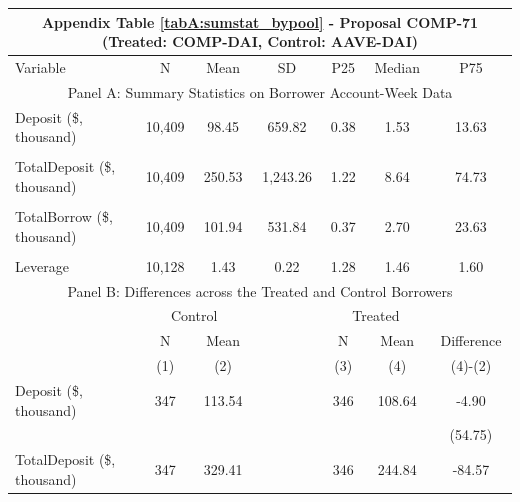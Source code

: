 
\clearpage
\newpage
\begin{table}[ht!]
\footnotesize 

\centering
\def\sym#1{\ifmmode^{#1}\else\(^{#1}\)\fi}


\begin{tabular*}{\linewidth}{@{\extracolsep{\fill}}lcccccc }

      \multicolumn{7}{c}{Appendix Table \ref{tabA:sumstat_bypool} - Proposal COMP-71 (Treated: COMP-DAI, Control: AAVE-DAI)} \\
    \toprule
     Variable  &N & Mean & SD & P25 & Median & P75 \\
     \midrule
    \multicolumn{7}{c}{Panel A: Summary Statistics on Borrower Account-Week Data} \\
    \midrule
    Deposit (\$, thousand) & 10,409 & 98.45 & 659.82 & 0.38  & 1.53  & 13.63 \\
          &       &       &       &       &       &  \\
    TotalDeposit (\$, thousand) & 10,409 & 250.53 & 1,243.26 & 1.22  & 8.64  & 74.73 \\
          &       &       &       &       &       &  \\
    TotalBorrow (\$, thousand) & 10,409 & 101.94 & 531.84 & 0.37  & 2.70  & 23.63 \\
          &       &       &       &       &       &  \\
    Leverage & 10,128 & 1.43  & 0.22  & 1.28  & 1.46  & 1.60 \\
    \midrule
        \multicolumn{7}{c}{Panel B: Differences across the Treated and Control Borrowers} \\
\midrule
          & \multicolumn{2}{c}{Control} &       & \multicolumn{2}{c}{Treated} &  \\
\cmidrule{2-3}\cmidrule{5-6}          & N & Mean &       & N & Mean & Difference \\
\cmidrule{2-3}\cmidrule{5-6}          & (1) & (2) &       & (3) & (4) & (4)-(2) \\
\cmidrule{2-7}    Deposit (\$, thousand) & 347   & 113.54 &       & 346   & 108.64 & -4.90 \\
          &       &       &       &       &       & (54.75) \\
    TotalDeposit (\$, thousand) & 347   & 329.41 &       & 346   & 244.84 & -84.57 \\

\end{tabular*}
\end{table}

